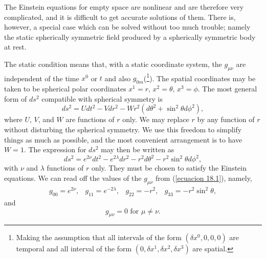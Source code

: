The Einstein equations for empty space are nonlinear and are therefore very complicated, and it is difficult to get 
accurate solutions of them. There is, however, a special case which can be solved without too much trouble; namely the 
static spherically symmetric field produced by a spherically symmetric body at rest.

The static condition means that, with a static coordinate system, the $g_{\mu\nu}$ are independent of the time $x^0$ or 
$t$ and also $g_{0m}$(\footnote{Making the assumption that all intervals of the form $(\delta x^0,0,0,0)$ are temporal 
and all interval of the form $(0,\delta x^1, \delta x^2, \delta x^3)$ are spatial.}). The spatial coordinates may be 
taken to be spherical polar coordinates $x^1 = r,\,x^2=\theta,\,x^3=\phi$. The most general form of $ds^2$ compatible 
with spherical symmetry is
\[
 ds^2 = U dt^2 - V dr^2 -W r^2(d\theta^2 + \sin^2\theta d\phi^2),
\]
where $U$, $V$, and $W$ are functions of $r$ only. We may replace $r$ by any function of $r$ without disturbing the 
spherical symmetry. We use this freedom to simplify things as much as possible, and the most convenient arrangement is 
to have $W=1$. The expression for $ds^2$ may then be written as 
\begin{equation}
 \label{ecuacion 18.1}
 ds^2 = e^{2\nu} dt^2 - e^{2\lambda} dr^2 - r^2 d\theta^2 - r^2 \sin^2 \theta d\phi^2,
\end{equation}
with $\nu$ and $\lambda$ functions of $r$ only. They must be chosen to satisfy the Einstein equations. We can read off 
the values of the $g_{\mu\nu}$ from (\ref{ecuacion 18.1}), namely,
\[
\begin{array}{cccc}
 g_00 = e^{2\nu}, & g_{11} = e^{-2\lambda}, & g_{22} = -r^2, & g_{33} = - r^2 \sin^2\theta,
\end{array}
\]
and 
\[
g_{\mu\nu} = 0 \mbox{ for } \mu \ne \nu .
\]
